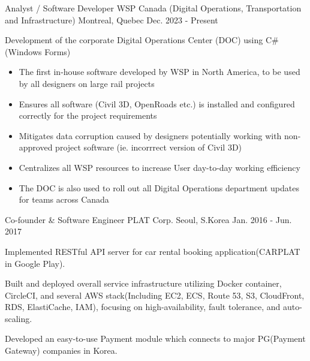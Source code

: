 

\begin{cventries}

  \cventry
    {Analyst / Software Developer} %
    {WSP Canada (Digital Operations, Transportation and Infrastructure)} %
    {Montreal, Quebec} %
    {Dec. 2023 - Present} %
    {
      \begin{cvitems} %
        \item {Development of the corporate Digital Operations Center (DOC) using C\# (Windows Forms)}
 \begin{itemize}
        \item {The first in-house software developed by WSP in North America, to be used by all designers on large rail projects}
        \item {Ensures all software (Civil 3D, OpenRoads etc.) is installed and configured correctly for the project requirements}
        \item {Mitigates data corruption caused by designers potentially working with non-approved project software (ie. incorrrect version of Civil 3D)}
        \item {Centralizes all WSP resources to increase User day-to-day working efficiency}
        \item {The DOC is also used to roll out all Digital Operations department updates for teams across Canada}
    \end{itemize}

      \end{cvitems}
    }

  \cventry
    {Co-founder \& Software Engineer} %
    {PLAT Corp.} %
    {Seoul, S.Korea} %
    {Jan. 2016 - Jun. 2017} %
    {
      \begin{cvitems} %
        \item {Implemented RESTful API server for car rental booking application(CARPLAT in Google Play).}
        \item {Built and deployed overall service infrastructure utilizing Docker container, CircleCI, and several AWS stack(Including EC2, ECS, Route 53, S3, CloudFront, RDS, ElastiCache, IAM), focusing on high-availability, fault tolerance, and auto-scaling.}
        \item {Developed an easy-to-use Payment module which connects to major PG(Payment Gateway) companies in Korea.}
      \end{cvitems}
    }


\end{cventries}
